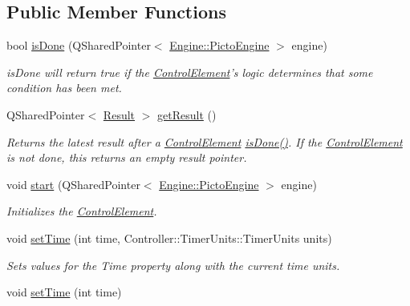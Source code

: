 \subsection*{Public Member Functions}
\begin{DoxyCompactItemize}
\item 
\hypertarget{class_picto_1_1_stopwatch_controller_aa388a0ce16f4c09c8ce884ad5f006f0a}{bool \hyperlink{class_picto_1_1_stopwatch_controller_aa388a0ce16f4c09c8ce884ad5f006f0a}{is\-Done} (Q\-Shared\-Pointer$<$ \hyperlink{class_picto_1_1_engine_1_1_picto_engine}{Engine\-::\-Picto\-Engine} $>$ engine)}\label{class_picto_1_1_stopwatch_controller_aa388a0ce16f4c09c8ce884ad5f006f0a}

\begin{DoxyCompactList}\small\item\em is\-Done will return true if the \hyperlink{class_picto_1_1_control_element}{Control\-Element}'s logic determines that some condition has been met. \end{DoxyCompactList}\item 
\hypertarget{class_picto_1_1_stopwatch_controller_ac63ea0ca9ba624044711f35dc5269885}{Q\-Shared\-Pointer$<$ \hyperlink{class_picto_1_1_result}{Result} $>$ \hyperlink{class_picto_1_1_stopwatch_controller_ac63ea0ca9ba624044711f35dc5269885}{get\-Result} ()}\label{class_picto_1_1_stopwatch_controller_ac63ea0ca9ba624044711f35dc5269885}

\begin{DoxyCompactList}\small\item\em Returns the latest result after a \hyperlink{class_picto_1_1_control_element}{Control\-Element} \hyperlink{class_picto_1_1_stopwatch_controller_aa388a0ce16f4c09c8ce884ad5f006f0a}{is\-Done()}. If the \hyperlink{class_picto_1_1_control_element}{Control\-Element} is not done, this returns an empty result pointer. \end{DoxyCompactList}\item 
void \hyperlink{class_picto_1_1_stopwatch_controller_a15e0f1023c0667695614e6b7f7848369}{start} (Q\-Shared\-Pointer$<$ \hyperlink{class_picto_1_1_engine_1_1_picto_engine}{Engine\-::\-Picto\-Engine} $>$ engine)
\begin{DoxyCompactList}\small\item\em Initializes the \hyperlink{class_picto_1_1_control_element}{Control\-Element}. \end{DoxyCompactList}\item 
void \hyperlink{class_picto_1_1_stopwatch_controller_a26c956d6ac3b08626b2f48ddaaca028e}{set\-Time} (int time, Controller\-::\-Timer\-Units\-::\-Timer\-Units units)
\begin{DoxyCompactList}\small\item\em Sets values for the Time property along with the current time units. \end{DoxyCompactList}\item 
\hypertarget{class_picto_1_1_stopwatch_controller_a4079d394ed6387b44fa794824045f743}{void \hyperlink{class_picto_1_1_stopwatch_controller_a4079d394ed6387b44fa794824045f743}{set\-Time} (int time)}\label{class_picto_1_1_stopwatch_controller_a4079d394ed6387b44fa794824045f743}


\end{DoxyCompactItemize}
